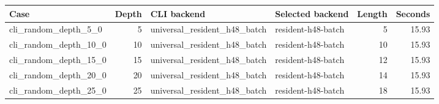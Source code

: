 {\small
\begin{tabular}{lrllrr}
\hline
Case & Depth & CLI backend & Selected backend & Length & Seconds \\
\hline
cli\_random\_depth\_5\_0 & 5 & universal\_resident\_h48\_batch & resident-h48-batch & 5 & 15.93 \\
cli\_random\_depth\_10\_0 & 10 & universal\_resident\_h48\_batch & resident-h48-batch & 10 & 15.93 \\
cli\_random\_depth\_15\_0 & 15 & universal\_resident\_h48\_batch & resident-h48-batch & 12 & 15.93 \\
cli\_random\_depth\_20\_0 & 20 & universal\_resident\_h48\_batch & resident-h48-batch & 14 & 15.93 \\
cli\_random\_depth\_25\_0 & 25 & universal\_resident\_h48\_batch & resident-h48-batch & 18 & 15.93 \\
\hline
\end{tabular}
}
